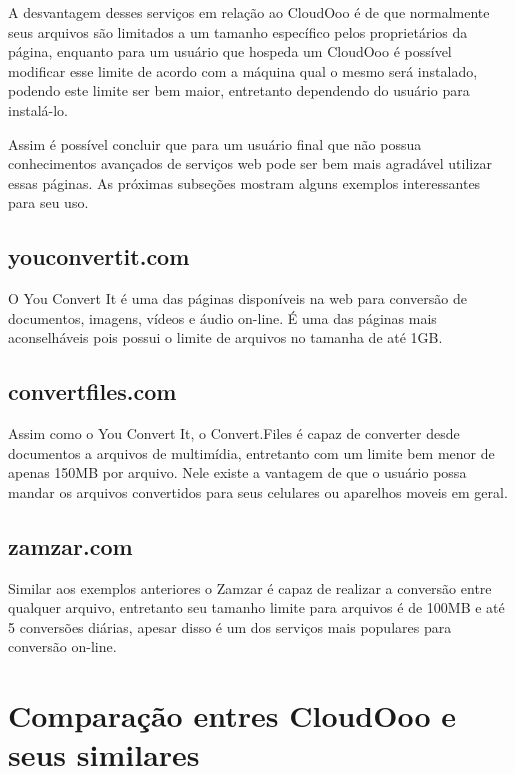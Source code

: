 A desvantagem desses serviços em relação ao CloudOoo é de que normalmente seus arquivos são limitados a um tamanho específico pelos proprietários da página, enquanto para um usuário que hospeda um CloudOoo é possível modificar esse limite de acordo com a máquina qual o mesmo será instalado, podendo este limite ser bem maior, entretanto dependendo do usuário para instalá-lo.

Assim é possível concluir que para um usuário final que não possua conhecimentos avançados de serviços web pode ser bem mais agradável utilizar essas páginas. As próximas subseções mostram alguns exemplos interessantes para seu uso.

\subsection{youconvertit.com}

O You Convert It é uma das páginas disponíveis na web para conversão de documentos, imagens, vídeos e áudio on-line. É uma das páginas mais aconselháveis pois possui o limite de arquivos no tamanha de até 1GB.

\subsection{convertfiles.com}

Assim como o You Convert It, o Convert.Files é capaz de converter desde documentos a arquivos de multimídia, entretanto com um limite bem menor de apenas 150MB por arquivo. Nele existe a vantagem de que o usuário possa mandar os arquivos convertidos para seus celulares ou aparelhos moveis em geral.

\subsection{zamzar.com}

Similar aos exemplos anteriores o Zamzar é capaz de realizar a conversão entre qualquer arquivo, entretanto seu tamanho limite para arquivos é de 100MB e até 5 conversões diárias, apesar disso é um dos serviços mais populares para conversão on-line.


\section{Comparação entres CloudOoo e seus similares}

